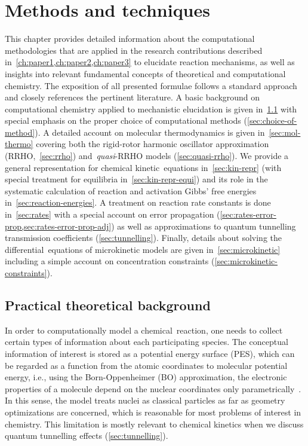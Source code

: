 \chapter{Methods and techniques}%
\label{ch:methods}

This chapter provides detailed information about the computational methodologies that are applied in the research contributions described in~\cref{ch:paper1,ch:paper2,ch:paper3} to elucidate reaction mechanisms,
as well as insights into relevant fundamental concepts of theoretical and computational chemistry.
The exposition of all presented formulae follows a standard approach and closely references the pertinent literature.
A basic background on computational chemistry applied to mechanistic elucidation is given in~\cref{sec:background-methods} with special emphasis on the proper choice of computational methods (\cref{sec:choice-of-method}).
A detailed account on molecular thermodynamics is given in~\cref{sec:mol-thermo} covering both the rigid-rotor harmonic oscillator approximation (RRHO,~\cref{sec:rrho}) and~\emph{quasi}-RRHO models (\cref{sec:quasi-rrho}).
We provide a general representation for chemical kinetic~equations in~\cref{sec:kin-repr} (with special treatment for equilibria in~\cref{sec:kin-repr-equi}) and its role in the systematic calculation of reaction and activation Gibbs' free energies in~\cref{sec:reaction-energies}.
A treatment on reaction rate constants is done in~\cref{sec:rates} with a special account on error propagation (\cref{sec:rates-error-prop,sec:rates-error-prop-adj}) as well as approximations to quantum tunnelling transmission coefficients (\cref{sec:tunnelling}).
Finally,
details about solving the differential~equations of microkinetic models are given in~\cref{sec:microkinetic} including a simple account on concentration constraints (\cref{sec:microkinetic-constraints}).

\section{Practical theoretical background}%
\label{sec:background-methods}

In order to computationally model a chemical~reaction,
one needs to collect certain types of information about each participating species.
The conceptual information of interest is stored as a potential energy surface (PES),
which can be regarded as a function from the atomic coordinates to molecular potential energy,
i.e.,
using the Born-Oppenheimer (BO) approximation,
the electronic properties of a molecule depend on the nuclear coordinates only parametrically~\cite{Born_1927}.
In this sense,
the model treats nuclei as classical particles as far as geometry optimizations are concerned,
which is reasonable for most problems of interest in chemistry.
This limitation is mostly relevant to chemical kinetics when we discuss quantum tunnelling effects (\cref{sec:tunnelling}).

